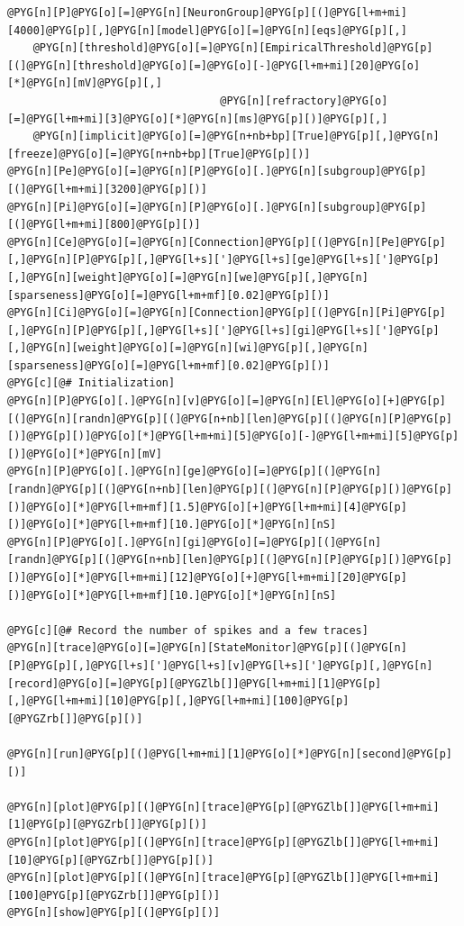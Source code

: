 \documentclass[letterpaper,10pt,english]{manual}
\begin{document}
\begin{Verbatim}[commandchars=@\[\]]
@PYG[n][P]@PYG[o][=]@PYG[n][NeuronGroup]@PYG[p][(]@PYG[l+m+mi][4000]@PYG[p][,]@PYG[n][model]@PYG[o][=]@PYG[n][eqs]@PYG[p][,]
    @PYG[n][threshold]@PYG[o][=]@PYG[n][EmpiricalThreshold]@PYG[p][(]@PYG[n][threshold]@PYG[o][=]@PYG[o][-]@PYG[l+m+mi][20]@PYG[o][*]@PYG[n][mV]@PYG[p][,]
                                 @PYG[n][refractory]@PYG[o][=]@PYG[l+m+mi][3]@PYG[o][*]@PYG[n][ms]@PYG[p][)]@PYG[p][,]
    @PYG[n][implicit]@PYG[o][=]@PYG[n+nb+bp][True]@PYG[p][,]@PYG[n][freeze]@PYG[o][=]@PYG[n+nb+bp][True]@PYG[p][)]
@PYG[n][Pe]@PYG[o][=]@PYG[n][P]@PYG[o][.]@PYG[n][subgroup]@PYG[p][(]@PYG[l+m+mi][3200]@PYG[p][)]
@PYG[n][Pi]@PYG[o][=]@PYG[n][P]@PYG[o][.]@PYG[n][subgroup]@PYG[p][(]@PYG[l+m+mi][800]@PYG[p][)]
@PYG[n][Ce]@PYG[o][=]@PYG[n][Connection]@PYG[p][(]@PYG[n][Pe]@PYG[p][,]@PYG[n][P]@PYG[p][,]@PYG[l+s][']@PYG[l+s][ge]@PYG[l+s][']@PYG[p][,]@PYG[n][weight]@PYG[o][=]@PYG[n][we]@PYG[p][,]@PYG[n][sparseness]@PYG[o][=]@PYG[l+m+mf][0.02]@PYG[p][)]
@PYG[n][Ci]@PYG[o][=]@PYG[n][Connection]@PYG[p][(]@PYG[n][Pi]@PYG[p][,]@PYG[n][P]@PYG[p][,]@PYG[l+s][']@PYG[l+s][gi]@PYG[l+s][']@PYG[p][,]@PYG[n][weight]@PYG[o][=]@PYG[n][wi]@PYG[p][,]@PYG[n][sparseness]@PYG[o][=]@PYG[l+m+mf][0.02]@PYG[p][)]
@PYG[c][@# Initialization]
@PYG[n][P]@PYG[o][.]@PYG[n][v]@PYG[o][=]@PYG[n][El]@PYG[o][+]@PYG[p][(]@PYG[n][randn]@PYG[p][(]@PYG[n+nb][len]@PYG[p][(]@PYG[n][P]@PYG[p][)]@PYG[p][)]@PYG[o][*]@PYG[l+m+mi][5]@PYG[o][-]@PYG[l+m+mi][5]@PYG[p][)]@PYG[o][*]@PYG[n][mV]
@PYG[n][P]@PYG[o][.]@PYG[n][ge]@PYG[o][=]@PYG[p][(]@PYG[n][randn]@PYG[p][(]@PYG[n+nb][len]@PYG[p][(]@PYG[n][P]@PYG[p][)]@PYG[p][)]@PYG[o][*]@PYG[l+m+mf][1.5]@PYG[o][+]@PYG[l+m+mi][4]@PYG[p][)]@PYG[o][*]@PYG[l+m+mf][10.]@PYG[o][*]@PYG[n][nS]
@PYG[n][P]@PYG[o][.]@PYG[n][gi]@PYG[o][=]@PYG[p][(]@PYG[n][randn]@PYG[p][(]@PYG[n+nb][len]@PYG[p][(]@PYG[n][P]@PYG[p][)]@PYG[p][)]@PYG[o][*]@PYG[l+m+mi][12]@PYG[o][+]@PYG[l+m+mi][20]@PYG[p][)]@PYG[o][*]@PYG[l+m+mf][10.]@PYG[o][*]@PYG[n][nS]

@PYG[c][@# Record the number of spikes and a few traces]
@PYG[n][trace]@PYG[o][=]@PYG[n][StateMonitor]@PYG[p][(]@PYG[n][P]@PYG[p][,]@PYG[l+s][']@PYG[l+s][v]@PYG[l+s][']@PYG[p][,]@PYG[n][record]@PYG[o][=]@PYG[p][@PYGZlb[]]@PYG[l+m+mi][1]@PYG[p][,]@PYG[l+m+mi][10]@PYG[p][,]@PYG[l+m+mi][100]@PYG[p][@PYGZrb[]]@PYG[p][)]

@PYG[n][run]@PYG[p][(]@PYG[l+m+mi][1]@PYG[o][*]@PYG[n][second]@PYG[p][)]

@PYG[n][plot]@PYG[p][(]@PYG[n][trace]@PYG[p][@PYGZlb[]]@PYG[l+m+mi][1]@PYG[p][@PYGZrb[]]@PYG[p][)]
@PYG[n][plot]@PYG[p][(]@PYG[n][trace]@PYG[p][@PYGZlb[]]@PYG[l+m+mi][10]@PYG[p][@PYGZrb[]]@PYG[p][)]
@PYG[n][plot]@PYG[p][(]@PYG[n][trace]@PYG[p][@PYGZlb[]]@PYG[l+m+mi][100]@PYG[p][@PYGZrb[]]@PYG[p][)]
@PYG[n][show]@PYG[p][(]@PYG[p][)]
\end{Verbatim}
\end{document}
